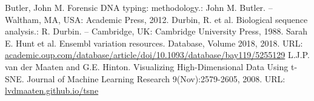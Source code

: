 \documentclass[a4paper,12pt]{article}
\begin{document}
	
	\tableofcontents \newpage

	

	\begin{thebibliography}{99}
		 Butler, John M. Forensic DNA typing: methodology.: John M. Butler. -- Waltham, MA, USA: Academic Press, 2012.
         Durbin, R. et al. Biological sequence analysis.: R. Durbin. -- Cambridge, UK: Cambridge University Press, 1988.
         Sarah E. Hunt et al. Ensembl variation resources. Database, Volume 2018, 2018. URL: \href{https://academic.oup.com/database/article/doi/10.1093/database/bay119/5255129}{academic.oup.com/database/article/doi/10.1093/database/bay119/5255129}
		 L.J.P. van der Maaten and G.E. Hinton. Visualizing High-Dimensional Data Using t-SNE. Journal of Machine Learning Research 9(Nov):2579-2605, 2008. URL: \href{https://lvdmaaten.github.io/tsne/}{lvdmaaten.github.io/tsne}
	\end{thebibliography}

	\newpage
	
\end{document}
